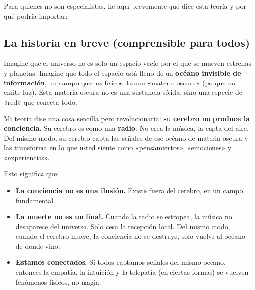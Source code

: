 \documentclass[11pt,a4paper]{article}
\begin{document}
Para quienes no son especialistas, he aquí brevemente qué dice esta teoría y por qué podría importar:

\subsection{La historia en breve (comprensible para todos)}
Imagine que el universo no es solo un espacio vacío por el que se mueven estrellas y planetas. Imagine que todo el espacio está lleno de un \textbf{océano invisible de información}, un campo que los físicos llaman «materia oscura» (porque no emite luz). Esta materia oscura no es una sustancia sólida, sino una especie de «red» que conecta todo.

Mi teoría dice una cosa sencilla pero revolucionaria: \textbf{su cerebro no produce la conciencia.} Su cerebro es como una \textbf{radio}. No crea la música, la capta del aire. Del mismo modo, su cerebro capta las señales de ese océano de materia oscura y las transforma en lo que usted siente como «pensamientos», «emociones» y «experiencias».

Esto significa que:
\begin{itemize}
    \item \textbf{La conciencia no es una ilusión.} Existe fuera del cerebro, en un campo fundamental.
    \item \textbf{La muerte no es un final.} Cuando la radio se estropea, la música no desaparece del universo. Solo cesa la recepción local. Del mismo modo, cuando el cerebro muere, la conciencia no se destruye, solo vuelve al océano de donde vino.
    \item \textbf{Estamos conectados.} Si todos captamos señales del mismo océano, entonces la empatía, la intuición y la telepatía (en ciertas formas) se vuelven fenómenos físicos, no magia.
\end{itemize}
\end{document}
